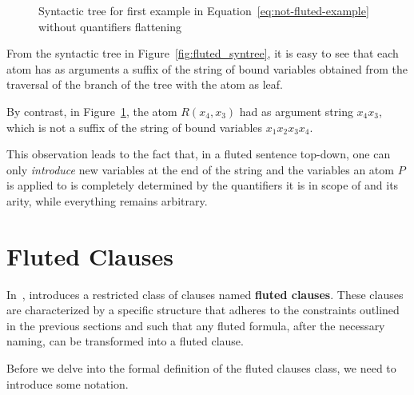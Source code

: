\begin{figure}[H]
    \centering
    \caption{Syntactic tree for first example in Equation~\ref{eq:not-fluted-example} without quantifiers flattening}\label{fig:not_fluted_syntree}
\end{figure}

From the syntactic tree in Figure~\ref{fig:fluted_syntree}, it is easy to see that each atom has as arguments a suffix of the string of bound variables obtained from the traversal of the branch of the tree with the atom as leaf.

By contrast, in Figure~\ref{fig:not_fluted_syntree}, the atom \(R(x_4, x_3)\) had as argument string \(x_4 x_3\), which is not a suffix of the string of bound variables \(x_1 x_2 x_3 x_4\).

This observation leads to the fact that, in  a fluted sentence top-down, one can only \emph{introduce} new variables at the end of the string and the variables an atom \(P\) is applied to is completely determined by the quantifiers it is in scope of and its arity, while everything remains arbitrary.

\section{Fluted Clauses}

In~\cite{schmidt2000resolution}, \citeauthor{schmidt2000resolution} introduces a restricted class of clauses named \textbf{fluted clauses}.
These clauses are characterized by a specific structure that adheres to the constraints outlined in the previous sections and such that any fluted formula, after the necessary naming, can be transformed into a fluted clause.

Before we delve into the formal definition of the fluted clauses class, we need to introduce some notation.

